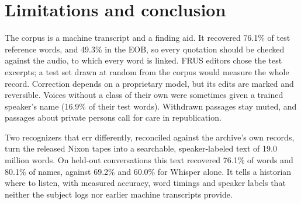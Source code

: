 \section{Limitations and conclusion}
\label{sec:conclusion}

 The corpus is a machine transcript and a finding aid. It recovered 76.1\% of test reference words, and 49.3\% in the EOB, so every quotation should be checked against the audio, to which every word is linked. FRUS editors chose the test excerpts; a test set drawn at random from the corpus would measure the whole record. Correction depends on a proprietary model, but its edits are marked and reversible. Voices without a class of their own were sometimes given a trained speaker's name (16.9\% of their test words). Withdrawn passages stay muted, and passages about private persons call for care in republication.

 Two recognizers that err differently, reconciled against the archive's own records, turn the released Nixon tapes into a searchable, speaker-labeled text of 19.0 million words. On held-out conversations this text recovered 76.1\% of words and 80.1\% of names, against 69.2\% and 60.0\% for Whisper alone. It tells a historian where to listen, with measured accuracy, word timings and speaker labels that neither the subject logs nor earlier machine transcripts provide.

